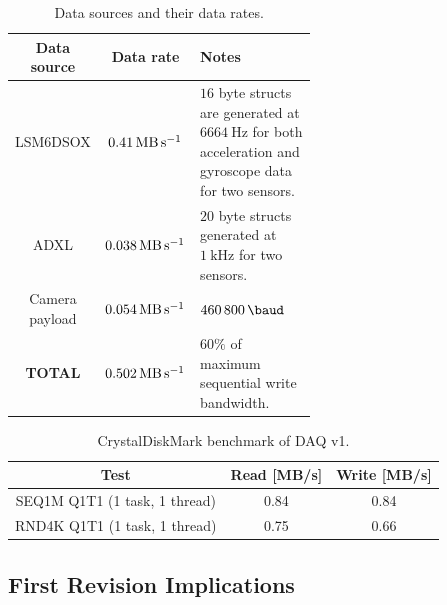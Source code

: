 \documentclass{report}
\begin{document}
\begin{table}[H]
  \centering
  \begin{tabular}{|c|c|L{0.6\linewidth}|}
    \hline
    \textbf{Data source} & \textbf{Data rate}                  & \textbf{Notes}                                                                                                   \\\hline
    LSM6\-DSOX           & $\SI{0.41}{\mega\byte\per\second}$  & $16$ byte structs are generated at $\SI{6664}{\hertz}$ for both acceleration and gyroscope data for two sensors. \\\hline
    ADXL            & $\SI{0.038}{\mega\byte\per\second}$ & $20$ byte structs generated at $\SI{1}{\kilo\hertz}$ for two sensors.                                            \\\hline
    Camera payload       & $\SI{0.054}{\mega\byte\per\second}$ & $\SI{460800}{\baud}$                                                                                             \\\hline
    \textbf{TOTAL}       & $\SI{0.502}{\mega\byte\per\second}$ & $60\%$ of maximum sequential write bandwidth.                                                                    \\\hline
  \end{tabular}
  \caption{Data sources and their data rates.}
  \label{tabl:daq-v1-sensor-datarate}
\end{table}

\begin{table}[H]
  \centering
  \begin{tabular}{|c|c|c|}
    \hline
    \textbf{Test}                 & \textbf{Read [MB/s]} & \textbf{Write [MB/s]} \\\hline
    SEQ1M Q1T1 (1 task, 1 thread) & 0.84                 & 0.84                  \\\hline
    RND4K Q1T1 (1 task, 1 thread) & 0.75                 & 0.66                  \\\hline
  \end{tabular}
  \caption{CrystalDiskMark benchmark of DAQ v1.}
  \label{tabl:daq-v1-diskmark}
\end{table}

\subsection{First Revision Implications}
\end{document}
